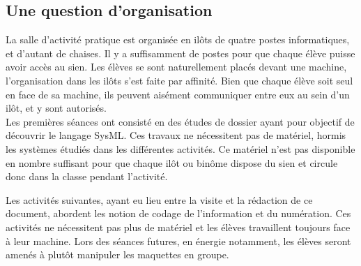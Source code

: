 \documentclass[pdftex,a4paper,12pt]{article}
\begin{document}
	\subsection{Une question d'organisation}
	La salle d'activité pratique est organisée en ilôts de quatre postes informatiques, et d'autant de chaises.
	Il y a suffisamment de postes pour que chaque élève puisse avoir accès au sien.
	Les élèves se sont naturellement placés devant une machine, l'organisation dans les ilôts s'est faite par affinité.
	Bien que chaque élève soit seul en face de sa machine, ils peuvent aisément communiquer entre eux au sein d'un ilôt, et y sont autorisés.\\

	Les premières séances ont consisté en des études de dossier ayant pour objectif de découvrir le langage SysML.
	Ces travaux ne nécessitent pas de matériel, hormis les systèmes étudiés dans les différentes activités.
	Ce matériel n'est pas disponible en nombre suffisant pour que chaque ilôt ou binôme dispose du sien et circule donc dans la classe pendant l'activité.

	Les activités suivantes, ayant eu lieu entre la visite et la rédaction de ce document, abordent les notion de codage de l'information et du numération.
	Ces activités ne nécessitent pas plus de matériel et les élèves travaillent toujours face à leur machine.
	Lors des séances futures, en énergie notamment, les élèves seront amenés à plutôt manipuler les maquettes en groupe.\\
\end{document}
